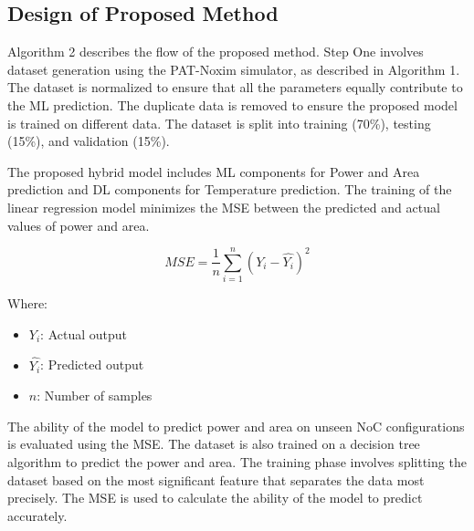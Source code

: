 \documentclass[conference]{IEEEtran}
\begin{document}
\subsection{Design of Proposed Method}
Algorithm 2 describes the flow of the proposed method. Step One involves dataset generation using the PAT-Noxim simulator, as described in Algorithm 1. The dataset is normalized to ensure that all the parameters equally contribute to the ML prediction. The duplicate data is removed to ensure the proposed model is trained on different data. The dataset is split into training (70\%), testing (15\%), and validation (15\%).

The proposed hybrid model includes ML components for Power and Area prediction and DL components for Temperature prediction. The training of the linear regression model minimizes the MSE between the predicted and actual values of power and area.

\[
MSE = \frac{1}{n} \sum_{i=1}^{n} \left( Y_i - \hat{Y_i} \right)^2
\]

Where:
\begin{itemize}
    \item \( Y_i \): Actual output
    \item \( \hat{Y_i} \): Predicted output
    \item \( n \): Number of samples
\end{itemize}
The ability of the model to predict power and area on unseen NoC configurations is evaluated using the MSE.
The dataset is also trained on a decision tree algorithm to predict the power and area. The training phase involves splitting the dataset based on the most significant feature that separates the data most precisely. The MSE is used to calculate the ability of the model to predict accurately.
\end{document}

